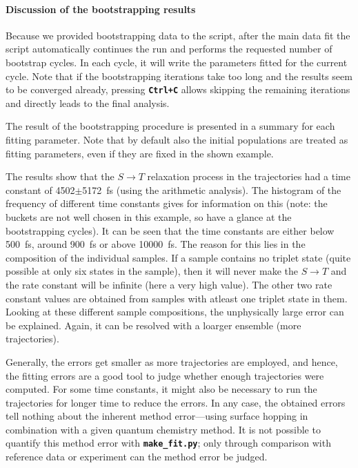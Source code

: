 \documentclass[a4paper,11pt,DIV=15,openany]{scrbook}
\newcommand{\ttt}[1]{\textbf{\texttt{#1}}}
\begin{document}
\paragraph{Discussion of the bootstrapping results}

Because we provided bootstrapping data to the script, after the main data fit the script automatically continues the run and performs the requested number of bootstrap cycles.
In each cycle, it will write the parameters fitted for the current cycle.
Note that if the bootstrapping iterations take too long and the results seem to be converged already, pressing \ttt{Ctrl+C} allows skipping the remaining iterations and directly leads to the final analysis.

The result of the bootstrapping procedure is presented in a summary for each fitting parameter.
Note that by default also the initial populations are treated as fitting parameters, even if they are fixed in the shown example.

The results show that the $S\rightarrow T$ relaxation process in the trajectories had a time constant of 4502$\pm$5172~fs (using the arithmetic analysis). 
The histogram of the frequency of different time constants gives for information on this (note: the buckets are not well chosen in this example, so have a glance at the bootstrapping cycles). It can be seen that the time constants are either below 500~fs, around 900~fs or above 10000~fs. The reason for this lies in the composition of the individual samples. If a sample contains no triplet state (quite possible at only six states in the sample), then it will never make the $S\rightarrow T$ and the rate constant will be infinite (here a very high value). The other two rate constant values are obtained from samples with atleast one triplet state in them. Looking at these different sample compositions, the unphysically large error can be explained. Again, it can be resolved with a loarger ensemble (more trajectories).

Generally, the errors get smaller as more trajectories are employed, and hence, the fitting errors are a good tool to judge whether enough trajectories were computed.
For some time constants, it might also be necessary to run the trajectories for longer time to reduce the errors.
In any case, the obtained errors tell nothing about the inherent method error---using surface hopping in combination with a given quantum chemistry method.
It is not possible to quantify this method error with \ttt{make\_fit.py}; only through comparison with reference data or experiment can the method error be judged.
\end{document}
